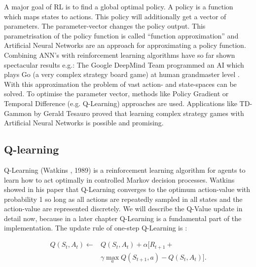 \documentclass[conference]{IEEEtran}
\begin{document}
A major goal of RL is to find a global optimal policy. A policy is a function which maps states to actions. This policy will additionally get a vector of parameters. The parameter-vector changes the policy output. This parametrisation of the policy function is called “function approximation” and Artificial Neural Networks are an approach for approximating a policy function. Combining ANN's with reinforcement learning algorithms have so far shown spectacular results e.g.: The Google DeepMind Team programmed an AI which plays Go (a very complex strategy board game) at human grandmaster level \cite{DRL:Silver_2016}. With this approximation the problem of vast action- and state-spaces can be solved. To optimise the parameter vector, methods  like Policy Gradient or Temporal Difference (e.g. Q-Learning) approaches are used. Applications like TD-Gammon by Gerald Tesauro proved that learning complex strategy games with Artificial Neural Networks is possible and promising.

\subsection{Q-learning}
Q-Learning (Watkins \cite{Watkins_1992}, 1989) is a reinforcement learning algorithm for agents to learn how to act optimally in controlled Markov decision processes. Watkins showed in his paper that Q-Learning converges to the optimum action-value with probability 1 so long as all actions are repeatedly sampled in all states and the action-value are represented discretely. We will describe the Q-Value update in detail now, because in a later chapter Q-Learning is a fundamental part of the implementation. The update rule of one-step Q-Learning is \cite{sutton_barto_98}:

\begin{equation} \label{equ:one step Q function}
\begin{split}
Q(S_t, A_t) \leftarrow & Q(S_t, A_t) + \alpha[R_{t+1} + \\
 & \gamma \max_a Q(S_{t+1},a) - Q(S_t, A_t)].
\end{split}
\end{equation}
\end{document}
